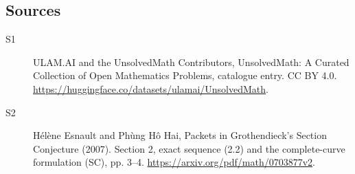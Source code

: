 \documentclass[11pt]{article}
\begin{document}
\subsection{Sources}
\begin{description}
\item[\hypertarget{source:statement:1}{S1}] ULAM.AI and the UnsolvedMath Contributors, UnsolvedMath: A Curated Collection of Open Mathematics Problems, catalogue entry. CC BY 4.0. \url{https://huggingface.co/datasets/ulamai/UnsolvedMath}.
\item[\hypertarget{source:statement:2}{S2}] Hélène Esnault and Phùng Hô Hai, Packets in Grothendieck’s Section Conjecture (2007). Section 2, exact sequence (2.2) and the complete-curve formulation (SC), pp. 3–4. \url{https://arxiv.org/pdf/math/0703877v2}.
\end{description}
\label{end:statement}
\end{document}
